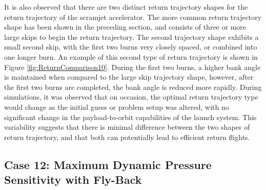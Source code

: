 It is also observed that there are two distinct return trajectory shapes for the return trajectory of the scramjet accelerator. The more common return trajectory shape has been shown in the preceding section, and consists of three or more large skips to begin the return trajectory. The second trajectory shape exhibits a small second skip, with the first two burns very closely spaced, or combined into one longer burn. An example of this second type of return trajectory is shown in Figure \ref{fig:ReturnComparison10}. During the first two burns, a higher bank angle is maintained when compared to the large skip trajectory shape, however, after the first two burns are completed, the bank angle is reduced more rapidly. 
During simulations, it was observed that on occasion, the optimal return trajectory type would change as the initial guess or problem setup was altered, with no significant change in the payload-to-orbit capabilities of the launch system. This variability suggests that there is minimal difference between the two shapes of return trajectory, and that both can potentially lead to efficient return flights. 





\subsection{Case 12: Maximum Dynamic Pressure Sensitivity with Fly-Back}

